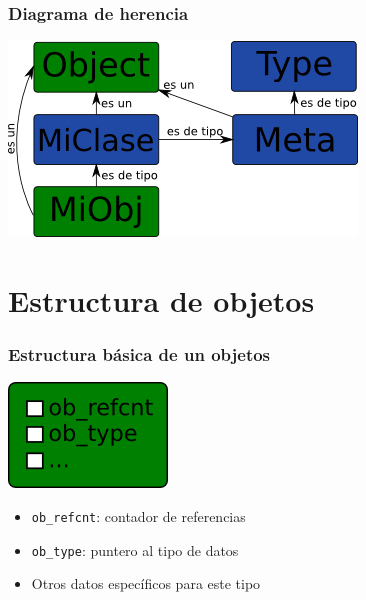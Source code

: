\documentclass[10pt]{beamer}
\begin{document}
  \begin{frame}[containsverbatim]
    \frametitle{Diagrama de herencia}
    \begin{center}\includegraphics{img/Metaclass-Relation.png}\end{center}
  \end{frame}

  \section*{Estructura de objetos}

  \begin{frame}[containsverbatim]
    \frametitle{Estructura básica de un objetos}
    \begin{center}\includegraphics{img/PyObject.png}\end{center}
    \begin{itemize}
      \item \verb+ob_refcnt+: contador de referencias
      \item \verb+ob_type+: puntero al tipo de datos
      \item Otros datos específicos para este tipo
    \end{itemize}
  \end{frame}
\end{document}
